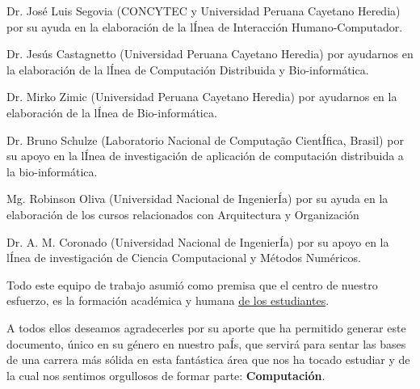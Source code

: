 \begin{itemize}
{\item Dr. José Luis Segovia (CONCYTEC y Universidad Peruana Cayetano Heredia) por su ayuda en la elaboración de la lÍnea de Interacción Humano-Computador.

\item Dr. Jes\'us Castagnetto (Universidad Peruana Cayetano Heredia) por ayudarnos en la elaboración de la lÍnea de Computación Distribuida y Bio-informática.

\item Dr. Mirko Zimic (Universidad Peruana Cayetano Heredia) por ayudarnos en la elaboración de la lÍnea de Bio-informática.

\item Dr. Bruno Schulze (Laboratorio Nacional de Computa\c{c}\~ao CientÍfica, Brasil) por su apoyo en la lÍnea de investigación de aplicación de computación distribuida a la bio-informática.

\item Mg. Robinson Oliva (Universidad Nacional de IngenierÍa) por su ayuda en la elaboración de los cursos relacionados con Arquitectura y Organización

\item Dr. A. M. Coronado (Universidad Nacional de IngenierÍa) por su apoyo en la lÍnea de investigación de Ciencia Computacional y Métodos Numéricos.
}
\end{itemize}



Todo este equipo de trabajo asumió como premisa que el centro de nuestro esfuerzo, 
es la formación académica y humana \underline{de los estudiantes}.

A todos ellos deseamos agradecerles por su aporte que ha permitido generar 
este documento, único en su género en nuestro paÍs, que servirá para sentar las 
bases de una carrera más sólida en esta fantástica área que nos ha tocado estudiar y 
de la cual nos sentimos orgullosos de formar parte: \textbf{Computación}.

